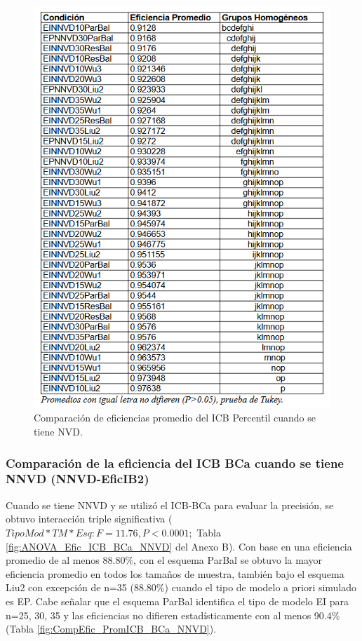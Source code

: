 \begin{figure}[ht] 
	\centering 
	\includegraphics[width=0.76\linewidth]{img/CompEfic_PromICB_Perc_NNVD.png} 
	\caption{Comparación de eficiencias promedio del ICB Percentil cuando se tiene NVD.} 
	\label{fig:CompEfic_PromICB_Perc_NNVD}
\end{figure}
\FloatBarrier




\subsubsection{Comparación de la eficiencia del ICB BCa cuando se tiene NNVD (NNVD-EficIB2)}

Cuando se tiene NNVD y se utilizó el ICB-BCa para evaluar la precisión, se obtuvo interacción triple significativa ($TipoMod*TM*Esq: F=11.76, P<0.0001;$ Tabla \ref{fig:ANOVA_Efic_ICB_BCa_NNVD} del Anexo B). Con base en una eficiencia promedio de al menos 88.80\%, con el esquema ParBal se obtuvo la mayor eficiencia promedio en todos los tamaños de muestra, también bajo el esquema Liu2 con excepción de n=35 (88.80\%) cuando el tipo de modelo a priori simulado es EP. Cabe señalar que el esquema ParBal identifica el tipo de modelo EI para n=25, 30, 35 y las eficiencias no difieren estadísticamente con al menos 90.4\% (Tabla \ref{fig:CompEfic_PromICB_BCa_NNVD}).\\


